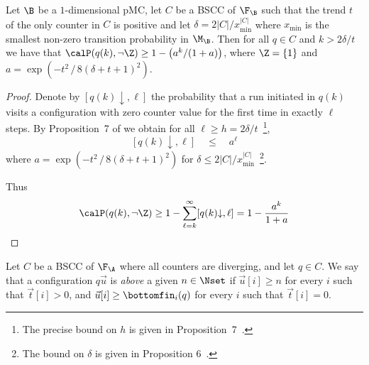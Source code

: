 \begin{lemma}
\label{lem-divergence}
  Let $\B$ be a $1$-dimensional pMC, let $C$ be a BSCC of $\F_\B$ 
  such that the trend $t$ of the only counter in $C$ is positive and let $\delta=2|C|/x_{\min}^{|C|}$ where $x_{\min}$ is the smallest non-zero transition probability in $\M_\B$.
  Then for all $q \in C$ and $k > 2\delta/t$ we have that  
  $\calP(q(k),\neg\Z) \geq 1-\left(a^k/(1+a)\right)$, where $\Z = \{1\}$ and $a=\exp\left(-t^2\, /\, 8(\delta+t+1)^2\right)$.
\end{lemma}
\begin{proof}
Denote by $[q(k){\downarrow},\ell]$ the probability that a run initiated in $q(k)$ visits a configuration with zero counter value for the first time in exactly $\ell$ steps. By Proposition~7 of \cite{BKK:pOC-time-LTL-martingale-arxiv} we obtain for all $\ell\geq h = 2\delta/t$~\footnote{The precise bound on $h$ is given in Proposition~7~\cite{BKK:pOC-time-LTL-martingale-arxiv}.},
\[
[q(k){\downarrow},\ell]\quad \leq\quad a^\ell
\]
where $a=\exp\left(-t^2\, /\, 8(\delta+t+1)^2\right)$ for $\delta\leq 2|C|/x_{\min}^{|C|}$~\footnote{The bound on $\delta$ is given in Proposition 6~\cite{BKK:pOC-time-LTL-martingale-arxiv}.}.

Thus
\[
\calP(q(k),\neg\Z)\geq 1-\sum_{\ell=k}^{\infty} [q(k){\downarrow},\ell]=1-\frac{a^k}{1+a}
\]
\end{proof}



\begin{definition}
  Let $C$ be a BSCC of $\F_{\A}$ where all counters are diverging,
  and let $q \in C$. We say that a configuration $q\vec{u}$
  is \emph{above} a given $n \in \Nset$ if $\vec{u}[i] \geq n$ for every
  $i$ such that $\vec{t}[i] > 0$, and 
  $\vec{u}[i] \geq \bottomfin_i(q)$ for every
  $i$ such that $\vec{t}[i] = 0$. 
\end{definition}


